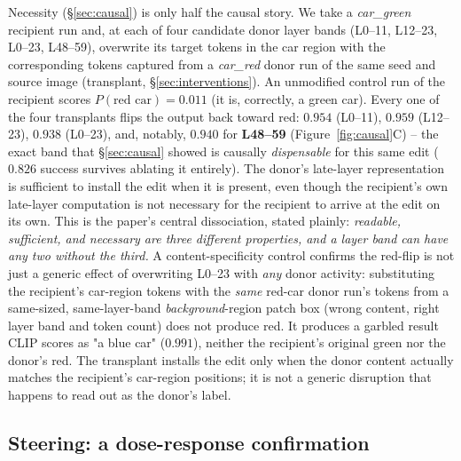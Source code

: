 \documentclass[10pt,twocolumn]{article}
\begin{document}
Necessity (\S\ref{sec:causal}) is only half the causal story. We take a
\emph{car\_green} recipient run and, at each of four candidate donor
layer bands (L0--11, L12--23, L0--23, L48--59), overwrite its target
tokens in the car region with the corresponding tokens captured from a
\emph{car\_red} donor run of the same seed and source image (transplant,
\S\ref{sec:interventions}). An unmodified control run of the recipient
scores $P(\text{red car})=0.011$ (it is, correctly, a green car). Every
one of the four transplants flips the output back toward red:
$0.954$ (L0--11), $0.959$ (L12--23), $0.938$ (L0--23), and, notably,
$0.940$ for \textbf{L48--59} (Figure~\ref{fig:causal}C) -- the exact
band that \S\ref{sec:causal} showed is causally \emph{dispensable} for
this same edit ($0.826$ success survives ablating it entirely). The
donor's late-layer representation is sufficient to install the edit
when it is present, even though the recipient's own late-layer
computation is not necessary for the recipient to arrive at the edit on
its own. This is the paper's central dissociation, stated plainly:
\emph{readable, sufficient, and necessary are three different
properties, and a layer band can have any two without the third.} A
content-specificity control confirms the red-flip is not just a generic
effect of overwriting L0--23 with \emph{any} donor activity: substituting
the recipient's car-region tokens with the \emph{same} red-car donor
run's tokens from a same-sized, same-layer-band \emph{background}-region
patch box (wrong content, right layer band and token count) does not
produce red. It produces a garbled result CLIP scores as "a blue car"
($0.991$), neither the recipient's original green nor the donor's red.
The transplant installs the edit only when the donor content actually
matches the recipient's car-region positions; it is not a generic
disruption that happens to read out as the donor's label.

\subsection{Steering: a dose-response confirmation}\label{sec:steer}
\end{document}
